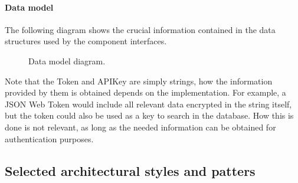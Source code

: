 \paragraph{Data model}
The following diagram shows the crucial information contained in the data structures used by the component interfaces. 

\begin{figure}[H]
    \centering
    \caption{\label{fig:data-model}Data model diagram.}
\end{figure}

Note that the Token and APIKey are simply strings, how the information provided by them is obtained depends on the implementation. For example, a JSON Web Token would include all relevant data encrypted in the string itself, but the token could also be used as a key to search in the database. How this is done is not relevant, as long as the needed information can be obtained for authentication purposes.

\subsection{Selected architectural styles and patters}

